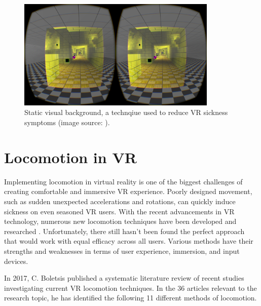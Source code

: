 \begin{figure}[th]
\centering
\includegraphics[width=0.85\textwidth]{img/static_background.png}
\caption{Static visual background, a technqiue used to reduce VR sickness symptoms (image source: \cite{STATICBACKGROUND}).}
\label{fig:STATIC_BACKGROUND}
\end{figure}

\section{Locomotion in VR}
Implementing locomotion in virtual reality is one of the biggest challenges of creating comfortable and immersive VR experience. Poorly designed movement, such as sudden unexpected accelerations and rotations, can quickly induce sickness on even seasoned VR users. With the recent advancements in VR technology, numerous new locomotion techniques have been developed and researched \cite{VRHCI}. Unfortunately, there still hasn't been found the perfect approach that would work with equal efficacy across all users. Various methods have their strengths and weaknesses in terms of user experience, immersion, and input devices. 

In 2017, C. Boletsis published a systematic literature review \cite{LOCOMOTIONREVIEW} of recent studies investigating current VR locomotion techniques. In the 36 articles relevant to the research topic, he has identified the following 11 different methods of locomotion. 

